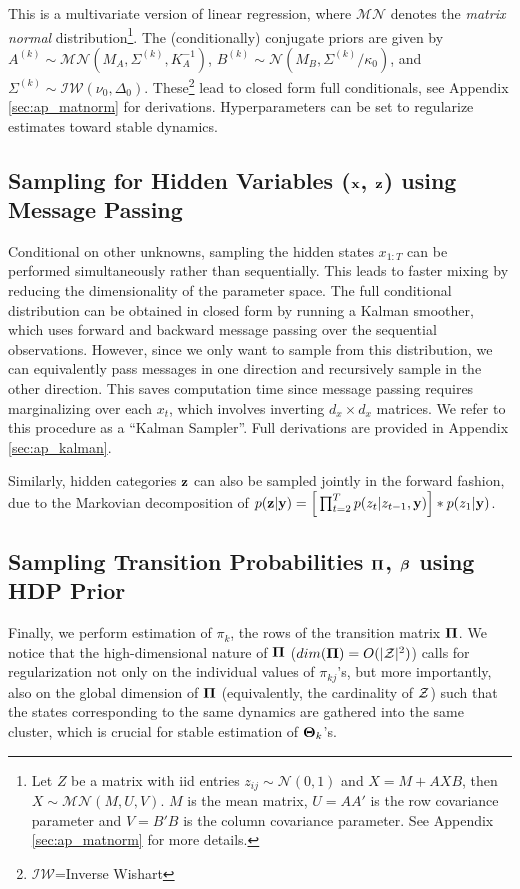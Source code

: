 \documentclass{article} %
\begin{document}
This is a multivariate version of linear regression, where $\mathcal{MN}$ denotes the \textit{matrix normal} distribution\footnote{Let $Z$ be a matrix with iid entries $z_{ij}\sim\mathcal{N}(0,1)$ and $X=M+AXB$, then $X\sim\mathcal{MN}(M,U,V)$. $M$ is the mean matrix, $U=AA'$ is the row covariance parameter and $V=B'B$ is the column covariance parameter. See Appendix \ref{sec:ap_matnorm} for more details.}. The (conditionally) conjugate priors are given by $A^{(k)}\sim\mathcal{MN}(M_A,\Sigma^{(k)},K_A^{-1})$, $B^{(k)}\sim\mathcal{N}(M_B,\Sigma^{(k)}/\kappa_0)$, and $\Sigma^{(k)}\sim\mathcal{IW}(\nu_0,\Delta_0)$. These\footnote{$\mathcal{IW}$=Inverse Wishart} lead to closed form full conditionals, see Appendix \ref{sec:ap_matnorm} for derivations. Hyperparameters can be set to regularize estimates toward stable dynamics.

\subsection{Sampling for Hidden Variables (${\bf x}$, ${\bf z}$) using Message Passing}

Conditional on other unknowns, sampling the hidden states $x_{1:T}$ can be performed simultaneously rather than sequentially. This leads to faster mixing by reducing the dimensionality of the parameter space. The full conditional distribution can be obtained in closed form by running a Kalman smoother, which uses forward and backward message passing over the sequential observations. However, since we only want to sample from this distribution, we can equivalently pass messages in one direction and recursively sample in the other direction. This saves computation time since message passing requires marginalizing over each $x_t$, which involves inverting $d_x\times d_x$ matrices. We refer to this procedure as a ``Kalman Sampler''. Full derivations are provided in Appendix \ref{sec:ap_kalman}.

Similarly, hidden categories ${\bf z}$ can also be sampled jointly in the forward fashion, due to the Markovian decomposition of $p({\bf z} | {\bf y}) = \Big[ \prod_{t=2}^T p(z_t| z_{t-1}, {\bf y}) \Big] * p(z_1|{\bf y})$.

\subsection{Sampling Transition Probabilities $\boldsymbol{\Pi}$, $\boldsymbol{\beta}$ using HDP Prior}
Finally, we perform estimation of $\pi_k$, the rows of the transition matrix $\boldsymbol{\Pi}$. We notice that the high-dimensional nature of $\boldsymbol{\Pi}$ ($dim(\boldsymbol{\Pi}) = O(|{\cal Z}|^2)$) calls for regularization  not only on the individual values of $\pi_{kj}$'s, but more importantly, also on the global dimension of $\boldsymbol{\Pi}$ (equivalently, the cardinality of ${\cal Z}$) such that the states corresponding to the same dynamics are gathered into the same cluster, which is crucial for stable estimation of $\boldsymbol{\Theta}_k$'s.
\end{document}
